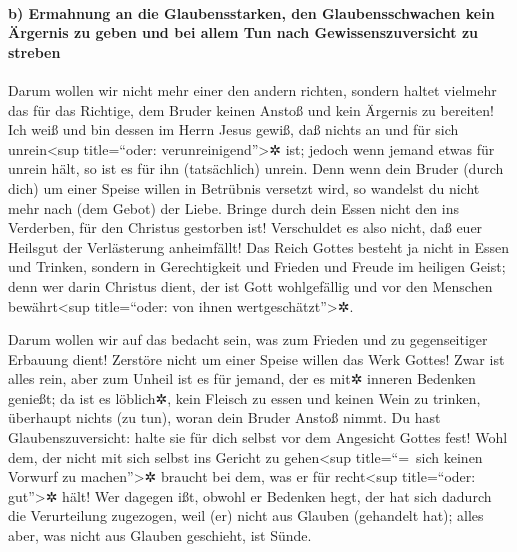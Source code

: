\hypertarget{b-ermahnung-an-die-glaubensstarken-den-glaubensschwachen-kein-uxe4rgernis-zu-geben-und-bei-allem-tun-nach-gewissenszuversicht-zu-streben}{%
\paragraph{b) Ermahnung an die Glaubensstarken, den Glaubensschwachen
kein Ärgernis zu geben und bei allem Tun nach Gewissenszuversicht zu
streben}\label{b-ermahnung-an-die-glaubensstarken-den-glaubensschwachen-kein-uxe4rgernis-zu-geben-und-bei-allem-tun-nach-gewissenszuversicht-zu-streben}}

 Darum wollen wir nicht mehr einer den andern richten,
sondern haltet vielmehr das für das Richtige, dem Bruder keinen Anstoß
und kein Ärgernis zu bereiten!  Ich weiß und bin dessen
im Herrn Jesus gewiß, daß nichts an und für sich unrein\textless sup
title=``oder: verunreinigend''\textgreater✲ ist; jedoch wenn jemand
etwas für unrein hält, so ist es für ihn (tatsächlich) unrein.
 Denn wenn dein Bruder (durch dich) um einer Speise
willen in Betrübnis versetzt wird, so wandelst du nicht mehr nach (dem
Gebot) der Liebe. Bringe durch dein Essen nicht den ins Verderben, für
den Christus gestorben ist!  Verschuldet es also nicht,
daß euer Heilsgut der Verlästerung anheimfällt!  Das
Reich Gottes besteht ja nicht in Essen und Trinken, sondern in
Gerechtigkeit und Frieden und Freude im heiligen Geist; 
denn wer darin Christus dient, der ist Gott wohlgefällig und vor den
Menschen bewährt\textless sup title=``oder: von ihnen
wertgeschätzt''\textgreater✲.

 Darum wollen wir auf das bedacht sein, was zum Frieden
und zu gegenseitiger Erbauung dient!  Zerstöre nicht um
einer Speise willen das Werk Gottes! Zwar ist alles rein, aber zum
Unheil ist es für jemand, der es mit✲ inneren Bedenken genießt;
 da ist es löblich✲, kein Fleisch zu essen und keinen
Wein zu trinken, überhaupt nichts (zu tun), woran dein Bruder Anstoß
nimmt.  Du hast Glaubenszuversicht: halte sie für dich
selbst vor dem Angesicht Gottes fest! Wohl dem, der nicht mit sich
selbst ins Gericht zu gehen\textless sup title=``=~sich keinen Vorwurf
zu machen''\textgreater✲ braucht bei dem, was er für recht\textless sup
title=``oder: gut''\textgreater✲ hält!  Wer dagegen ißt,
obwohl er Bedenken hegt, der hat sich dadurch die Verurteilung
zugezogen, weil (er) nicht aus Glauben (gehandelt hat); alles aber, was
nicht aus Glauben geschieht, ist Sünde.

